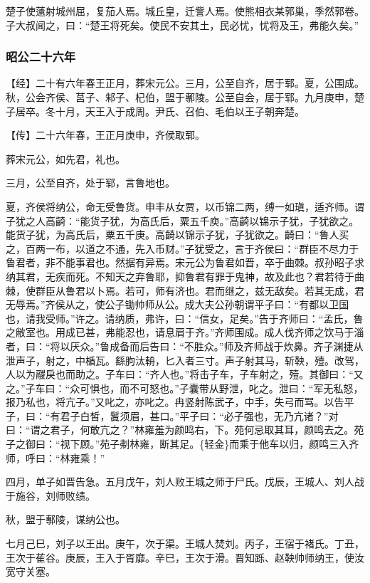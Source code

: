 \documentclass[]{article}
\begin{document}
楚子使薳射城州屈，复茄人焉。城丘皇，迁訾人焉。使熊相衣某郭巢，季然郭卷。子大叔闻之，曰：``楚王将死矣。使民不安其土，民必忧，忧将及王，弗能久矣。''

\hypertarget{header-n2787}{%
\subsubsection{昭公二十六年}\label{header-n2787}}

【经】二十有六年春王正月，葬宋元公。三月，公至自齐，居于郓。夏，公围成。秋，公会齐侯、莒子、邾子、杞伯，盟于鄟陵。公至自会，居于郓。九月庚申，楚子居卒。冬十月，天王入于成周。尹氏、召伯、毛伯以王子朝奔楚。

【传】二十六年春，王正月庚申，齐侯取郓。

葬宋元公，如先君，礼也。

三月，公至自齐，处于郓，言鲁地也。

夏，齐侯将纳公，命无受鲁货。申丰从女贾，以币锦二两，缚一如瑱，适齐师。谓子犹之人高齮：``能货子犹，为高氏后，粟五千庾。''高齮以锦示子犹，子犹欲之。能货子犹，为高氏后，粟五千庚。高齮以锦示子犹，子犹欲之。齮曰：``鲁人买之，百两一布，以道之不通，先入币财。''子犹受之，言于齐侯曰：``群臣不尽力于鲁君者，非不能事君也。然据有异焉。宋元公为鲁君如晋，卒于曲棘。叔孙昭子求纳其君，无疾而死。不知天之弃鲁耶，抑鲁君有罪于鬼神，故及此也？君若待于曲棘，使群臣从鲁君以卜焉。若可，师有济也。君而继之，兹无敌矣。若其无成，君无辱焉。''齐侯从之，使公子锄帅师从公。成大夫公孙朝谓平子曰：``有都以卫国也，请我受师。''许之。请纳质，弗许，曰：``信女，足矣。''告于齐师曰：``孟氏，鲁之敝室也。用成已甚，弗能忍也，请息肩于齐。''齐师围成。成人伐齐师之饮马于淄者，曰：``将以厌众。''鲁成备而后告曰：``不胜众。''师及齐师战于炊鼻。齐子渊捷从泄声子，射之，中楯瓦。繇朐汰輈，匕入者三寸。声子射其马，斩鞅，殪。改驾，人以为鬷戾也而助之。子车曰：``齐人也。''将击子车，子车射之，殪。其御曰：``又之。''子车曰：``众可惧也，而不可怒也。''子囊带从野泄，叱之。泄曰：``军无私怒，报乃私也，将亢子。''又叱之，亦叱之。冉竖射陈武子，中手，失弓而骂。以告平子，曰：``有君子白皙，鬒须眉，甚口。''平子曰：``必子强也，无乃亢诸？''对曰：``谓之君子，何敢亢之？''林雍羞为颜鸣右，下。苑何忌取其耳，颜鸣去之。苑子之御曰：``视下顾。''苑子刜林雍，断其足。\{轻金\}而乘于他车以归，颜鸣三入齐师，呼曰：``林雍乘！''

四月，单子如晋告急。五月戊午，刘人败王城之师于尸氏。戊辰，王城人、刘人战于施谷，刘师败绩。

秋，盟于鄟陵，谋纳公也。

七月己巳，刘子以王出。庚午，次于渠。王城人焚刘。丙子，王宿于褚氏。丁丑，王次于萑谷。庚辰，王入于胥靡。辛巳，王次于滑。晋知跞、赵鞅帅师纳王，使汝宽守关塞。
\end{document}

